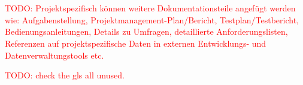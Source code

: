 \documentclass[12pt, a4paper, oneside]{book}   	%
\renewcommand{\todo}[1]{\textcolor{red}{TODO: #1}}
\begin{document}
	
	\chapter{\bibname}
		\printbibliography[heading=none]
		
		
		
		\appendix
			\todo{Projektspezifisch können weitere Dokumentationsteile angefügt werden wie: Aufgabenstellung, Projektmanagement-Plan/Bericht, Testplan/Testbericht, Bedienungsanleitungen, Details zu Umfragen, detaillierte Anforderungslisten, Referenzen auf projektspezifische Daten in externen Entwicklungs- und Datenverwaltungstools etc.}
			
		\glsaddallunused                                %
		\todo{check the gls all unused.}
	
\end{document}
